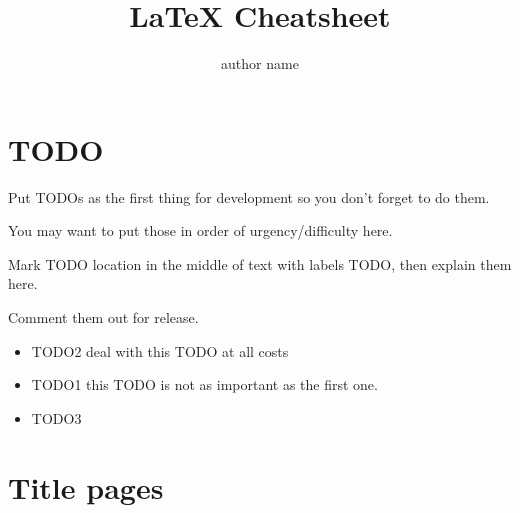 \documentclass[12pt]{article}
\title{LaTeX Cheatsheet}
\author{author name}
\begin{document}
\tableofcontents
\newpage

\section{TODO}

  \begin{remark}
    Put TODOs as the first \label{TODO2} thing for development so you don't forget to do them.

    You may want to put those in order of urgency/difficulty here.

    Mark TODO location in \label{TODO1} the middle of text with labels TODO, then explain them here.

    Comment them out for release.
  \end{remark}

  \begin{itemize}
    \item TODO2 deal with this TODO at all costs
    \item TODO1 this TODO is not as important as the first one.
    \item TODO3
  \end{itemize}

\section{Title pages} \label{title-pages}

  \maketitle
  \newpage
\end{document}
